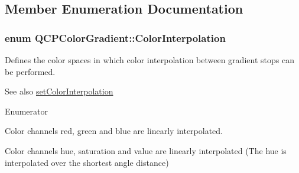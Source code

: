 \subsection{Member Enumeration Documentation}
\hypertarget{class_q_c_p_color_gradient_ac5dca17cc24336e6ca176610e7f77fc1}{}
\subsubsection[{Color\+Interpolation}]{\setlength{\rightskip}{0pt plus 5cm}enum {\bf Q\+C\+P\+Color\+Gradient\+::\+Color\+Interpolation}}\label{class_q_c_p_color_gradient_ac5dca17cc24336e6ca176610e7f77fc1}
Defines the color spaces in which color interpolation between gradient stops can be performed.

\begin{DoxySeeAlso}{See also}
\hyperlink{class_q_c_p_color_gradient_aa13fda86406e1d896a465a409ae63b38}{set\+Color\+Interpolation} 
\end{DoxySeeAlso}
\begin{Desc}
\item[Enumerator]\par
\begin{description}
\item[{\em 
\hypertarget{class_q_c_p_color_gradient_ac5dca17cc24336e6ca176610e7f77fc1a5e30f725c9cfe93999e268a9f92afbe7}{}ci\+R\+G\+B\label{class_q_c_p_color_gradient_ac5dca17cc24336e6ca176610e7f77fc1a5e30f725c9cfe93999e268a9f92afbe7}
}]Color channels red, green and blue are linearly interpolated. \item[{\em 
\hypertarget{class_q_c_p_color_gradient_ac5dca17cc24336e6ca176610e7f77fc1af14ae62fcae11ecc07234eeaec5856cb}{}ci\+H\+S\+V\label{class_q_c_p_color_gradient_ac5dca17cc24336e6ca176610e7f77fc1af14ae62fcae11ecc07234eeaec5856cb}
}]Color channels hue, saturation and value are linearly interpolated (The hue is interpolated over the shortest angle distance) \end{description}
\end{Desc}
\hypertarget{class_q_c_p_color_gradient_aed6569828fee337023670272910c9072}{}
